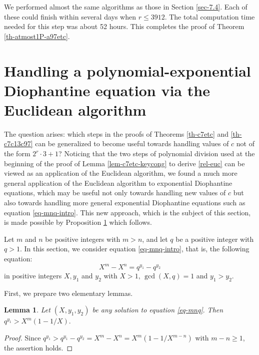 \documentclass[11pt]{amsart}
\newtheorem{lem}{Lemma}[section]
\numberwithin{equation}{section}
\begin{document}
We performed almost the same algorithms as those in Section \ref{sec-7.4}. 
Each of these could finish within several days when $r \le 3912$.
The total computation time needed for this step was about 52 hours. 
This completes the proof of Theorem \ref{th-atmost1P-a97etc}.

\section{Handling a polynomial-exponential Diophantine equation via the Euclidean algorithm} \label{sec-3}

The question arises:  which steps in the proofs of Theorems \ref{th-c7etc} and \ref{th-c7c13c97} can be generalized to become useful towards handling values of $c$ not of the form $2^r \cdot 3 + 1$?  
Noticing that the two steps of polynomial division used at the beginning of the proof of Lemma \ref{lem-c7etc-keycong} to derive \eqref{rel-euc} can be viewed as an application of the Euclidean algorithm, we found a much more general application of the Euclidean algorithm to exponential Diophantine equations, which may be useful not only towards handling new values of $c$ but also towards handling more general exponential Diophantine equations such as equation \eqref{eq-mnq-intro}.  
This new approach, which is the subject of this section, is made possible by Proposition \ref{lem-EucAlg-maximalterms} which follows.  

Let $m$ and $n$ be positive integers with $m>n$, and let $q$ be a positive integer with $q>1.$
In this section, we consider equation \eqref{eq-mnq-intro}, that is, the following equation:
\begin{equation}\label{eq-mnq}
X^m - X^n = q^{y_1} - q^{y_2}
\end{equation}
in positive integers $X, y_1$ and $y_2$ with $X>1,\,\gcd(X,q)=1$ and $y_1>y_2$.

First, we prepare two elementary lemmas.

\begin{lem}\label{lem-EucAlg-maximalterms}
Let $(X,y_1,y_2)$ be any solution to equation \eqref{eq-mnq}$.$
Then $q^{y_1}>X^m(1-1/X).$
\end{lem}

\begin{proof}
Since $q^{y_1}>q^{y_1}-q^{y_2}=X^m - X^{n}=X^m(1-1/X^{m-n})$ with $m-n \ge 1$, the assertion holds.
\end{proof}
\end{document}
